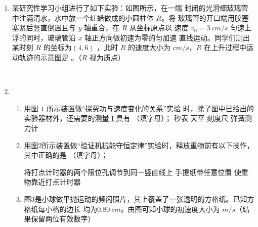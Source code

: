 \begin{enumerate}
\item 
{}
某研究性学习小组进行了如下实验：如图所示，在一端
封闭的光滑细玻璃管中注满清水，水中放一个红蜡做成的小圆柱体 $ R $。将
玻璃管的开口端用胶塞塞紧后竖直倒置且与 $ y $ 轴重合，在 $ R $ 从坐标原点以
速度 $ v_{0} =3 \ cm/s $ 匀速上浮的同时，玻璃管沿 $ x $ 轴正方向做初速为零的匀加速
直线运动。同学们测出某时刻 $ R $ 的坐标为$ (4,6) $
，此时 $ R $ 的速度大小为  
$ cm/s $，$ R $ 在上升过程中运动轨迹的示意图是
 。（$ R $ 视为质点）
\begin{figure}[h!]
\centering
\\
\vspace{1.6em}
  
\end{figure}




\newpage
\item 
{}
\begin{enumerate}
\renewcommand{\labelenumi}{\arabic{enumi}.}
\item
用图 $ 1 $ 所示装置做“探究功与速度变化的关系”实验
时，除了图中已给出的实验器材外，还需要的测量工具有  （填字母）；
\fourchoices
{秒表}
{天平}
{刻度尺}
{弹簧测力计}


\item 
用图$ 2 $所示装置做“验证机械能守恒定律”实验时，释放重物前有以下操作，其中正确的是  
（填字母）；

\threechoices
{将打点计时器的两个限位孔调节到同一竖直线上}
{手提纸带任意位置}
{使重物靠近打点计时器}

\item 
图$ 3 $是小球做平抛运动的频闪照片，其上覆盖了一张透明的方格纸。已知方格纸每小格的边长
均为$ 0.80 \ cm $。由图可知小球的初速度大小为  $ m/s $（结果保留两位有效数字）
\begin{figure}[h!]
\centering

\end{figure}




\end{enumerate}




\end{enumerate}
